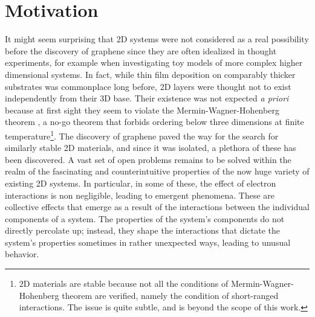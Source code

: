 \section{Motivation}
\label{sec:motivation}

It might seem surprising that \ac{2D} systems were not considered as a real possibility before the discovery of graphene since they are often idealized in thought experiments, for example when investigating toy models of more complex higher dimensional systems.
In fact, while thin film deposition on comparably thicker substrates was commonplace long before, \ac{2D} layers were thought not to exist independently from their 3D base.
Their existence was not expected \emph{a priori} because at first sight they seem to violate the Mermin-Wagner-Hohenberg theorem \cite{mermin_absence_1966, coleman_there_1973, hohenberg_existence_1967}, a no-go theorem that forbids ordering below three dimensions at finite temperature\footnote{\ac{2D} materials are stable because not all the conditions of Mermin-Wagner-Hohenberg theorem are verified, namely the condition of short-ranged interactions. The issue is quite subtle, and is beyond the scope of this work.}.
The discovery of graphene paved the way for the search for similarly stable \ac{2D} materials, and since it was isolated, a plethora of these has been discovered.
A vast set of open problems remains to be solved within the realm of the fascinating and counterintuitive properties of the now huge variety of existing \ac{2D} systems.
In particular, in some of these, the effect of electron interactions is non negligible, leading to emergent phenomena.
These are collective effects that emerge as a result of the interactions between the individual components of a system.
The properties of the system's components do not directly percolate up; instead, they shape the interactions that dictate the system's properties sometimes in rather unexpected ways, leading to unusual behavior.

